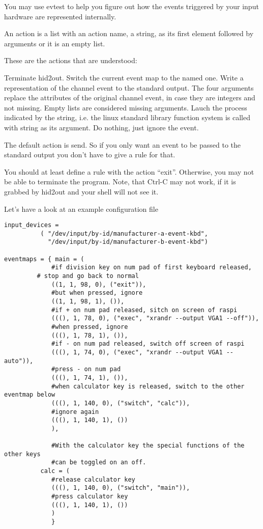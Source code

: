 \begin{pdescription}
  You may use evtest to help you figure out how the events 
  triggered by your input hardware 
  are represented internally.

  An action is a list with an action name, a string, 
  as its first element followed by arguments or
  it is an empty list.
 
  These are the actions that are understood:

  \begin{pdescription}
    Terminate hid2out.
    Switch the current event map to the named one.
    Write a representation of the channel event to the 
    standard output. The four arguments replace the
    attributes of the original channel event,
    in case they are integers and not missing.
    Empty lists are considered missing arguments.
    Lauch the process indicated by the string, i.e. the linux standard library function system is 
    called with string as its argument.
    Do nothing, just ignore the event.
\end{pdescription}
  
  The default action is send. So if you only want an event
  to be passed to the standard output you don't have to
  give a rule for that.

  You should at least define a rule with the action ``exit''.
  Otherwise, you may not be able to terminate the program.
  Note, that Ctrl-C may not work, if it is grabbed by 
  hid2out and your shell will not see it.
\end{pdescription}

Let's have a look at an example configuration file

\begin{verbatim}
input_devices =
	      (	"/dev/input/by-id/manufacturer-a-event-kbd",
	        "/dev/input/by-id/manufacturer-b-event-kbd")

eventmaps = { main = (
	      	 #if division key on num pad of first keyboard released,
		 # stop and go back to normal
	      	 ((1, 1, 98, 0), ("exit")),
	      	 #but when pressed, ignore
	      	 ((1, 1, 98, 1), ()),
 	      	 #if + on num pad released, sitch on screen of raspi
	      	 (((), 1, 78, 0), ("exec", "xrandr --output VGA1 --off")),
	      	 #when pressed, ignore
	      	 (((), 1, 78, 1), ()),
 	      	 #if - on num pad released, switch off screen of raspi
	      	 (((), 1, 74, 0), ("exec", "xrandr --output VGA1 --auto")),
	      	 #press - on num pad 
	      	 (((), 1, 74, 1), ()),
	      	 #when calculator key is released, switch to the other eventmap below
	      	 (((), 1, 140, 0), ("switch", "calc")),
	      	 #ignore again
	      	 (((), 1, 140, 1), ())
	      	 ),

	      	 #With the calculator key the special functions of the other keys
	      	 #can be toggled on an off.
	      calc = (
	      	 #release calculator key
	      	 (((), 1, 140, 0), ("switch", "main")),
	      	 #press calculator key
	      	 (((), 1, 140, 1), ())
	      	 )   
	      	 }  
\end{verbatim}

